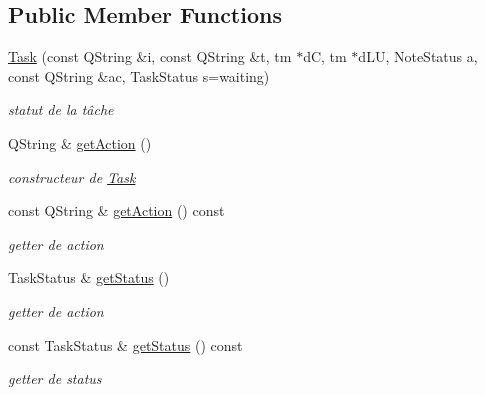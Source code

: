 \subsection*{Public Member Functions}
\begin{DoxyCompactItemize}
\item 
\mbox{\label{classTask_a5f0da3938bd101b7fff51d18fb567503}} 
\hyperlink{classTask_a5f0da3938bd101b7fff51d18fb567503}{Task} (const Q\+String \&i, const Q\+String \&t, tm $\ast$dC, tm $\ast$d\+LU, Note\+Status a, const Q\+String \&ac, Task\+Status s=waiting)
\begin{DoxyCompactList}\small\item\em statut de la tâche \end{DoxyCompactList}\item 
\mbox{\label{classTask_a53fbad8336b141bfffffda6dac17596d}} 
Q\+String \& \hyperlink{classTask_a53fbad8336b141bfffffda6dac17596d}{get\+Action} ()
\begin{DoxyCompactList}\small\item\em constructeur de \hyperlink{classTask}{Task} \end{DoxyCompactList}\item 
\mbox{\label{classTask_a638b4578e5bc135e1e24cc7125e2ba0d}} 
const Q\+String \& \hyperlink{classTask_a638b4578e5bc135e1e24cc7125e2ba0d}{get\+Action} () const
\begin{DoxyCompactList}\small\item\em getter de action \end{DoxyCompactList}\item 
\mbox{\label{classTask_a72dad7ede510324a4a95f74ee305bb2c}} 
Task\+Status \& \hyperlink{classTask_a72dad7ede510324a4a95f74ee305bb2c}{get\+Status} ()
\begin{DoxyCompactList}\small\item\em getter de action \end{DoxyCompactList}\item 
\mbox{\label{classTask_ae41cd94fc9578dcee38ea3a9315db717}} 
const Task\+Status \& \hyperlink{classTask_ae41cd94fc9578dcee38ea3a9315db717}{get\+Status} () const
\begin{DoxyCompactList}\small\item\em getter de status \end{DoxyCompactList}\item 

\end{DoxyCompactItemize}
